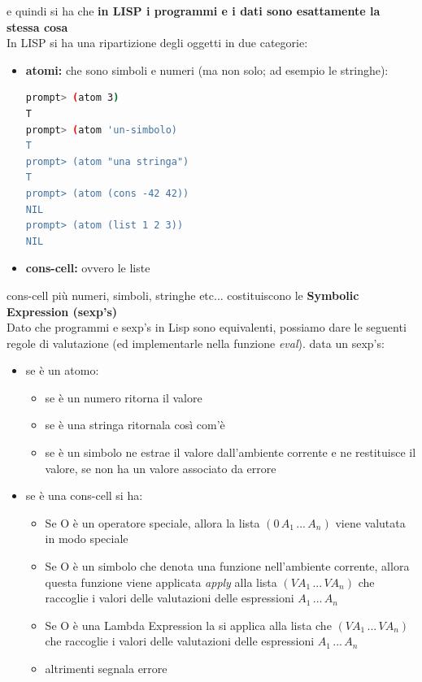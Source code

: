 \documentclass[a4paper,12pt, oneside]{book}
\begin{document}
e quindi si ha che \textbf{in LISP i programmi e i dati sono esattamente la stessa cosa}\\
In LISP si ha una ripartizione degli oggetti in due categorie:
\begin{itemize}
\item \textbf{atomi:} che sono simboli e numeri (ma non solo; ad esempio le stringhe):
\begin{shaded}
\begin{lstlisting}[language=bash]
prompt> (atom 3)
T
prompt> (atom 'un-simbolo)
T
prompt> (atom "una stringa")
T
prompt> (atom (cons -42 42))
NIL
prompt> (atom (list 1 2 3))
NIL
\end{lstlisting}
\end{shaded}
\item \textbf{cons-cell:} ovvero le liste
\end{itemize}
cons-cell più numeri, simboli, stringhe etc... costituiscono le \textbf{Symbolic Expression (sexp's)}\\
Dato che programmi e sexp's in Lisp sono equivalenti, possiamo dare le seguenti regole di valutazione (ed implementarle nella funzione \textit{eval}). data un sexp's:
\begin{itemize}
\item se è un atomo:
\begin{itemize}
\item se è un numero ritorna il valore
\item se è una stringa ritornala così com'è
\item se è un simbolo ne estrae il valore dall'ambiente corrente e ne restituisce il valore, se non ha un valore associato da errore
\end{itemize}
\item se è una cons-cell si ha:
\begin{itemize}
\item Se O è un operatore speciale, allora la lista $(0\, A_1\,...\,A_n)$ viene valutata in modo speciale
\item Se O è un simbolo che denota una funzione nell'ambiente corrente, allora questa
funzione viene applicata \textit{apply} alla lista $(VA_1\,...\, VA_n)$ che raccoglie i
valori delle valutazioni delle espressioni $A_1\,...\,A_n$
\item Se O è una Lambda Expression la si applica alla lista che $(VA_1\,...\, VA_n)$
che raccoglie i valori delle valutazioni delle espressioni $A_1\,...\,A_n$
\item altrimenti segnala errore
\end{itemize}
\end{itemize}
\end{document}
